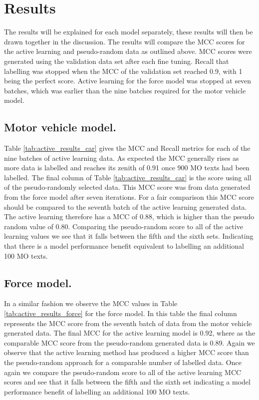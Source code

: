 \section{Results} The results will be explained for each model separately, these results will then be drawn together in the discussion. The results will compare the MCC scores for the active learning and pseudo-random data as outlined above. MCC scores were generated using the validation data set after each fine tuning. Recall that labelling was stopped when the MCC of the validation set reached 0.9, with 1 being the perfect score. Active learning for the force model was stopped at seven batches, which was earlier than the nine batches required for the motor vehicle model.

\subsection{Motor vehicle model.} Table \ref{tab:active_results_car} gives the MCC and Recall metrics for each of the nine batches of active learning data. As expected the MCC generally rises as more data is labelled and reaches its zenith of 0.91 once 900 MO texts had been labelled. The final column of Table \ref{tab:active_results_car}  is the score using all of the pseudo-randomly selected data. This MCC score was from data generated from the force model after seven iterations. For a fair comparison this MCC score should be compared to the seventh batch of the active learning generated data. The active learning therefore has a MCC of 0.88, which is higher than the pseudo random value of 0.80. Comparing the pseudo-random score to all of the active learning values we see that it falls between the fifth and the sixth sets. Indicating that there is a model performance benefit equivalent to labelling an additional 100 MO texts.

\subsection{Force model.} In a similar fashion we observe the MCC values in Table \ref{tab:active_results_force} for the force model. In this table the final column represents the MCC score from the seventh batch of data from the motor vehicle generated data. The final MCC for the active learning model is 0.92, where as the comparable MCC score from the pseudo-random generated data is 0.89. Again we observe that the active learning method has produced a higher MCC score than the pseudo-random approach for a comparable number of labelled data.  Once again we compare the pseudo-random score to all of the active learning MCC scores and see that it falls between the fifth and the sixth set indicating a model performance benefit of labelling an additional 100 MO texts.





